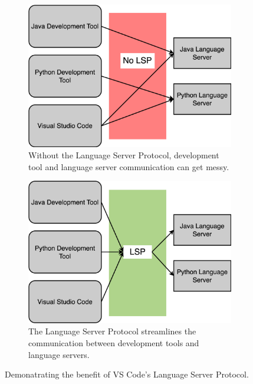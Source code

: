 \documentclass{article}
\begin{document}
\begin{figure}
    \begin{subfigure}[c][][c]{0.45\textwidth}
        \begin{center}
            \includegraphics[width=\textwidth]{no-lsp-theory.png}
            \caption{Without the Language Server Protocol, development tool and language server communication can get messy.}
            \label{fig:no-lsp-theory}
        \end{center}
    \end{subfigure}
    \hspace{0.05\textwidth}
    \begin{subfigure}[c][][c]{0.45\textwidth}
        \begin{center}
            \includegraphics[width=\textwidth]{lsp-theory.png}
            \caption{The Language Server Protocol streamlines the communication between development tools and language servers.}
            \label{fig:lsp-theory}
        \end{center}
    \end{subfigure}
    \caption{Demonatrating the benefit of VS Code's Language Server Protocol.}
    \label{fig:lsp}
\end{figure}
\end{document}
